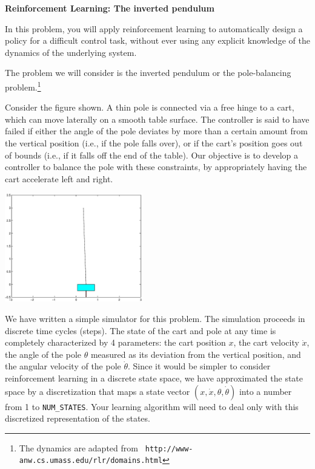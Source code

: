 
\item {} {\bf Reinforcement Learning: The inverted pendulum}

In this problem, you will apply reinforcement learning to automatically
design a policy for a difficult control task, without ever using any 
explicit knowledge of the dynamics of the underlying system.

The problem we will consider is the inverted pendulum or the pole-balancing 
problem.\footnote{The dynamics are adapted from {\tt
    http://www-anw.cs.umass.edu/rlr/domains.html}}

Consider the figure shown. A thin pole is connected via a free hinge to a cart, 
which can move laterally on a smooth table surface. The controller is said to 
have failed if either the angle of the pole deviates by more than a certain
amount from the vertical position (i.e., if the pole falls over), or if the
cart's position goes out of bounds (i.e., if it falls off the end of the table).
Our objective is to develop a controller to balance the pole with these 
constraints, by appropriately having the cart accelerate left and right.


\begin{center}
  \includegraphics[width=6cm]{cartpole/cart_pole.eps}
\end{center}

We have written a simple simulator for this problem. The simulation 
proceeds in discrete time cycles (steps). The state of the cart and pole at any time 
is completely characterized by 4 parameters: the cart position $x$, the 
cart velocity $\dot{x}$, the angle of the pole $\theta$ measured as its deviation 
from the vertical position, and the angular velocity of the pole $\dot{\theta}$.  
Since it would be simpler to
consider reinforcement learning in a discrete state space,
we have approximated the state space by a discretization that maps 
a state vector $(x,\dot{x}, \theta, \dot{\theta})$ into a number
from 1 to {\tt NUM\_STATES}. Your learning algorithm will need to 
deal only with this discretized representation of the states.

